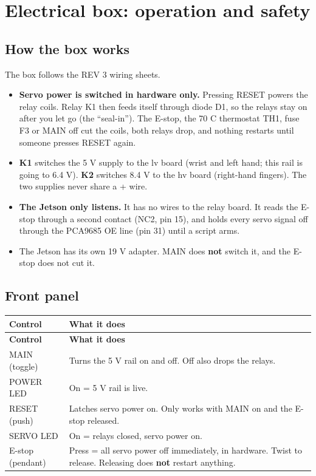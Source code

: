 \documentclass[11pt,letterpaper]{article}
\newcommand{\code}[1]{\textcolor{codeblue}{\ttfamily\smaller\relax #1}}
\begin{document}
\section{Electrical box: operation and safety}

\subsection{How the box works}
The box follows the REV 3 wiring sheets.

\begin{itemize}
  \item \textbf{Servo power is switched in hardware only.} Pressing RESET powers the relay coils. Relay K1 then feeds itself through diode D1, so the relays stay on after you let go (the ``seal-in''). The E-stop, the 70 \textdegree{}C thermostat TH1, fuse F3 or MAIN off cut the coils, both relays drop, and nothing restarts until someone presses RESET again.
  \item \textbf{K1} switches the 5 V supply to the \code{lv} board (wrist and left hand; this rail is going to 6.4 V). \textbf{K2} switches 8.4 V to the \code{hv} board (right-hand fingers). The two supplies never share a + wire.
  \item \textbf{The Jetson only listens.} It has no wires to the relay board. It reads the E-stop through a second contact (NC2, pin 15), and holds every servo signal off through the PCA9685 OE line (pin 31) until a script arms.
  \item The Jetson has its own 19 V adapter. MAIN does \textbf{not} switch it, and the E-stop does not cut it.
\end{itemize}


\subsection{Front panel}
{\small
\begin{longtable}{|>{\raggedright\arraybackslash}p{}|>{\raggedright\arraybackslash}p{}|}
\hline
\rowcolor{tblhead}\textbf{Control} & \textbf{What it does} \\ \hline
\endfirsthead
\hline
\rowcolor{tblhead}\textbf{Control} & \textbf{What it does} \\ \hline
\endhead
MAIN (toggle) & Turns the 5 V rail on and off. Off also drops the relays. \\ \hline
POWER LED & On = 5 V rail is live. \\ \hline
RESET (push) & Latches servo power on. Only works with MAIN on and the E-stop released. \\ \hline
SERVO LED & On = relays closed, servo power on. \\ \hline
E-stop (pendant) & Press = all servo power off immediately, in hardware. Twist to release. Releasing does \textbf{not} restart anything. \\ \hline
\end{longtable}}
\end{document}
